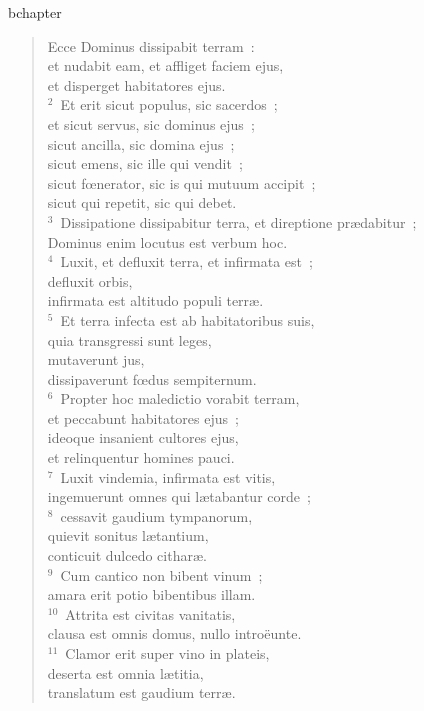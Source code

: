 bchapter\begin{verse}\vspace{-19pt}Ecce Dominus dissipabit terram~:\\ et nudabit eam, et affliget faciem ejus,\\ et disperget habitatores ejus.\\
${}^{2}$~Et erit sicut populus, sic sacerdos~;\\ et sicut servus, sic dominus ejus~;\\ sicut ancilla, sic domina ejus~;\\ sicut emens, sic ille qui vendit~;\\ sicut fœnerator, sic is qui mutuum accipit~;\\ sicut qui repetit, sic qui debet.\\
${}^{3}$~Dissipatione dissipabitur terra, et direptione pr\ae dabitur~;\\ Dominus enim locutus est verbum hoc.\\
${}^{4}$~Luxit, et defluxit terra, et infirmata est~;\\ defluxit orbis,\\ infirmata est altitudo populi terr\ae .\\
${}^{5}$~Et terra infecta est ab habitatoribus suis,\\ quia transgressi sunt leges,\\ mutaverunt jus,\\ dissipaverunt fœdus sempiternum.\\
${}^{6}$~Propter hoc maledictio vorabit terram,\\ et peccabunt habitatores ejus~;\\ ideoque insanient cultores ejus,\\ et relinquentur homines pauci.\\
${}^{7}$~Luxit vindemia, infirmata est vitis,\\ ingemuerunt omnes qui l\ae tabantur corde~;\\
${}^{8}$~cessavit gaudium tympanorum,\\ quievit sonitus l\ae tantium,\\ conticuit dulcedo cithar\ae .\\
${}^{9}$~Cum cantico non bibent vinum~;\\ amara erit potio bibentibus illam.\\
${}^{10}$~Attrita est civitas vanitatis,\\ clausa est omnis domus, nullo intro\"eunte.\\
${}^{11}$~Clamor erit super vino in plateis,\\ deserta est omnia l\ae titia,\\ translatum est gaudium terr\ae .\\

\end{verse}
